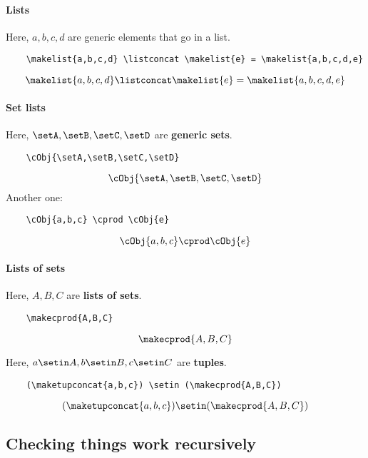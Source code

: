 \paragraph{Lists}
Here, $a, b, c, d$ are generic elements that go in a list.
\begin{verbatim}
    \makelist{a,b,c,d} \listconcat \makelist{e} = \makelist{a,b,c,d,e}
\end{verbatim}
\begin{equation}
    \makelist{a,b,c,d} \listconcat \makelist{e} = \makelist{a,b,c,d,e}
\end{equation}

\paragraph{Set lists}
Here, $\setA, \setB, \setC, \setD$ are \textbf{generic sets}.
\begin{verbatim}
    \cObj{\setA,\setB,\setC,\setD}
\end{verbatim}
\begin{equation}
    \cObj{\setA,\setB,\setC,\setD}
\end{equation}
Another one:
\begin{verbatim}
    \cObj{a,b,c} \cprod \cObj{e}
\end{verbatim}
\begin{equation}
    \cObj{a,b,c} \cprod \cObj{e}
\end{equation}

\paragraph{Lists of sets}
Here, $A, B, C$ are \textbf{lists of sets}.
\begin{verbatim}
    \makecprod{A,B,C}
\end{verbatim}
\begin{equation}
    \makecprod{A,B,C}
\end{equation}

Here, $a \setin A, b \setin B, c \setin C$ are \textbf{tuples}.
\begin{verbatim}
    (\maketupconcat{a,b,c}) \setin (\makecprod{A,B,C})
\end{verbatim}
\begin{equation}
    (\maketupconcat{a,b,c})
    \setin (\makecprod{A,B,C})
\end{equation}

\subsection{Checking things work recursively}

